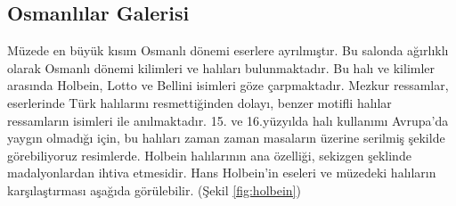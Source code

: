 \subsection{Osmanlılar Galerisi}
\indent\indent Müzede en büyük kısım Osmanlı dönemi eserlere ayrılmıştır. Bu salonda ağırlıklı olarak Osmanlı dönemi kilimleri ve halıları bulunmaktadır. Bu halı ve kilimler arasında Holbein, Lotto ve Bellini isimleri göze çarpmaktadır. Mezkur ressamlar, eserlerinde Türk halılarını resmettiğinden dolayı, benzer motifli halılar ressamların isimleri ile anılmaktadır. 15. ve 16.yüzyılda halı kullanımı Avrupa'da yaygın olmadığı için, bu halıları zaman zaman masaların üzerine serilmiş şekilde görebiliyoruz resimlerde. Holbein halılarının ana özelliği, sekizgen şeklinde madalyonlardan ihtiva etmesidir. Hans Holbein'in eseleri ve müzedeki halıların karşılaştırması aşağıda görülebilir. (Şekil \ref{fig:holbein})\newline
